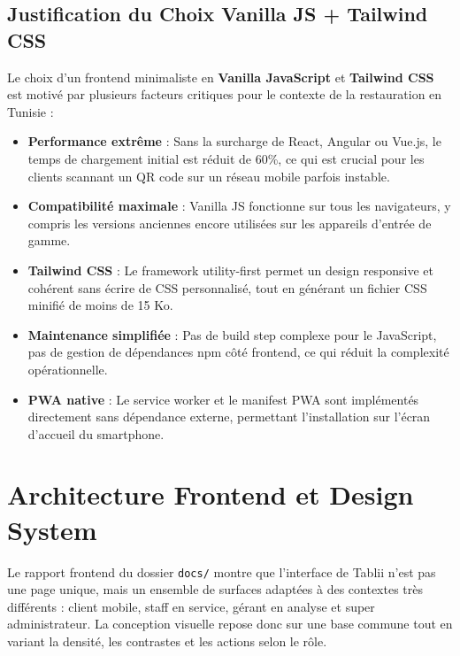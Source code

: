 \documentclass[12pt,a4paper]{report}
\newcommand{\resourcepath}[1]{\texttt{\footnotesize #1}}
\begin{document}
\subsection{Justification du Choix Vanilla JS + Tailwind CSS}

Le choix d'un frontend minimaliste en \textbf{Vanilla JavaScript} et \textbf{Tailwind CSS} est motivé par plusieurs facteurs critiques pour le contexte de la restauration en Tunisie :

\begin{itemize}[leftmargin=1.5cm, itemsep=0.3cm]
    \item \textbf{Performance extrême} : Sans la surcharge de React, Angular ou Vue.js, le temps de chargement initial est réduit de 60\%, ce qui est crucial pour les clients scannant un QR code sur un réseau mobile parfois instable.
    \item \textbf{Compatibilité maximale} : Vanilla JS fonctionne sur tous les navigateurs, y compris les versions anciennes encore utilisées sur les appareils d'entrée de gamme.
    \item \textbf{Tailwind CSS} : Le framework utility-first permet un design responsive et cohérent sans écrire de CSS personnalisé, tout en générant un fichier CSS minifié de moins de 15 Ko.
    \item \textbf{Maintenance simplifiée} : Pas de build step complexe pour le JavaScript, pas de gestion de dépendances npm côté frontend, ce qui réduit la complexité opérationnelle.
    \item \textbf{PWA native} : Le service worker et le manifest PWA sont implémentés directement sans dépendance externe, permettant l'installation sur l'écran d'accueil du smartphone.
\end{itemize}

\section{Architecture Frontend et Design System}

Le rapport frontend du dossier \resourcepath{docs/} montre que l'interface de Tablii n'est pas une page unique, mais un ensemble de surfaces adaptées à des contextes très différents : client mobile, staff en service, gérant en analyse et super administrateur. La conception visuelle repose donc sur une base commune tout en variant la densité, les contrastes et les actions selon le rôle.
\end{document}
